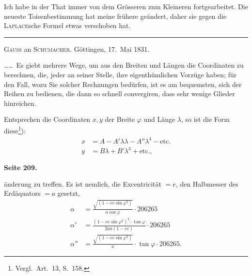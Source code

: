 \documentclass[12pt,a4paper]{article}
\newcommand{\tang}{\tan}
\theoremstyle{plain}
\theoremstyle{definition}
\theoremstyle{remark}
\begin{document}
Ich habe in der That immer von dem Grösseren zum Kleineren fortgearbeitet. Die neueste Toisenbestimmung hat meine frühere geändert, daher sie gegen die \textsc{Laplace}sche Formel etwas verschoben hat.

\medskip
\hrule
\medskip

\textsc{Gauß} an \textsc{Schumacher}. Göttingen, 17.~Mai 1831.

\ldots\ldots\ Es giebt mehrere Wege, um aus den Breiten und Längen die Coordinaten zu berechnen, die, jeder an seiner Stelle, ihre eigenthümlichen Vorzüge haben; für den Fall, wozu Sie solcher Rechnungen bedürfen, ist es am bequemsten, sich der Reihen zu bedienen, die dann so schnell convergiren, dass sehr wenige Glieder hinreichen.

Entsprechen die Coordinaten $x, y$ der Breite $\varphi$ und Länge $\lambda$, so ist die Form diese\footnote{Vergl.~Art.~13, S.~158.}):
\begin{align*}
x &= A - A'\lambda\lambda - A''\lambda^4 - \text{etc.} \\
y &= B\lambda + B'\lambda^3 + \text{etc.},
\end{align*}

\newpage
\textbf{Seite 209.}

änderung zu treffen. Es ist nemlich, die Excentricität $= e$, den Halbmesser des Erdäquators $= a$ gesetzt,
\begin{align*}
\alpha &= \frac{\sqrt{(1 - ee \sin \varphi^2)}}{a \cos \varphi} \cdot 206265 \\
\alpha' &= \frac{(1 - ee \sin \varphi^2)^2 \cdot \tang \varphi}{2aa(1 - ee)} \cdot 206265 \\
\alpha'' &= \frac{\sqrt{(1 - ee \sin \varphi^2)}}{a} \cdot \tang \varphi \cdot 206265.
\end{align*}
\end{document}
